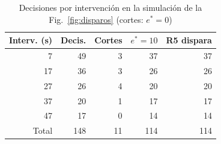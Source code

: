 \begin{table}[!t]
\caption{Decisiones por intervención en la simulación de la Fig.~\ref{fig:disparos} (cortes: $e^*{=}0$)}
\label{tab:intervenciones}
\centering
\footnotesize
\begin{tabular}{rrrrr}
\hline
Interv. (s) & Decis. & Cortes & $e^*{=}10$ & R5 dispara \\
\hline
7  & 49 & 3 & 37 & 37 \\
17  & 36 & 3 & 26 & 26 \\
27  & 26 & 4 & 20 & 20 \\
37  & 20 & 1 & 17 & 17 \\
47  & 17 & 0 & 14 & 14 \\
\hline
Total & 148 & 11 & 114 & 114 \\
\hline
\end{tabular}
\end{table}
